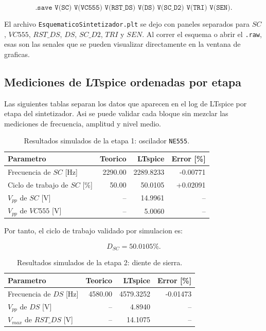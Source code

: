 ﻿\documentclass[11pt,letterpaper]{article}
\begin{document}
\[
\texttt{.save V(SC) V(VC555) V(RST\_DS) V(DS) V(SC\_D2) V(TRI) V(SEN)}.
\]

El archivo \texttt{EsquematicoSintetizador.plt} se dejo con paneles separados
para \(SC\), \(VC555\), \(RST\_DS\), \(DS\), \(SC\_D2\), \(TRI\) y \(SEN\).
Al correr el esquema o abrir el \texttt{.raw}, esas son las senales que se
pueden visualizar directamente en la ventana de graficas.

\subsection{Mediciones de LTspice ordenadas por etapa}

Las siguientes tablas separan los datos que aparecen en el log de LTspice por
etapa del sintetizador. Asi se puede validar cada bloque sin mezclar las
mediciones de frecuencia, amplitud y nivel medio.

\begin{table}[H]
\centering
\begin{tabular}{lrrr}
\toprule
Parametro & Teorico & LTspice & Error [\%] \\
\midrule
Frecuencia de \(SC\) [Hz] & 2290.00 & 2289.8233 & -0.00771 \\
Ciclo de trabajo de \(SC\) [\%] & 50.00 & 50.0105 & +0.02091 \\
\(V_{pp}\) de \(SC\) [V] & -- & 14.9961 & -- \\
\(V_{pp}\) de \(VC555\) [V] & -- & 5.0060 & -- \\
\bottomrule
\end{tabular}
\caption{Resultados simulados de la etapa 1: oscilador \texttt{NE555}.}
\end{table}

Por tanto, el ciclo de trabajo validado por simulacion es:

\[
D_{SC}=50.0105\%.
\]

\begin{table}[H]
\centering
\begin{tabular}{lrrr}
\toprule
Parametro & Teorico & LTspice & Error [\%] \\
\midrule
Frecuencia de \(DS\) [Hz] & 4580.00 & 4579.3252 & -0.01473 \\
\(V_{pp}\) de \(DS\) [V] & -- & 4.8940 & -- \\
\(V_{max}\) de \(RST\_DS\) [V] & -- & 14.1075 & -- \\
\bottomrule
\end{tabular}
\caption{Resultados simulados de la etapa 2: diente de sierra.}
\end{table}
\end{document}
